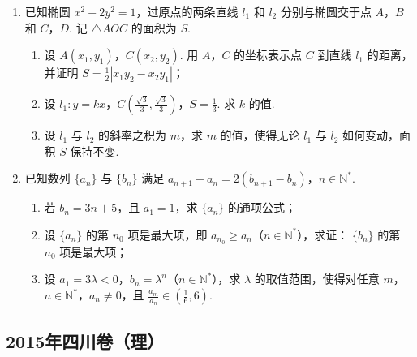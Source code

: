 \begin{description}
\begin{enumerate}[leftmargin=5pt]
        \item 已知椭圆 \(x^{2} + 2y^{2} = 1\)，过原点的两条直线 \(l_{1}\) 和 \(l_{2}\) 分别与椭圆交于点 \(A\)，\(B\) 和 \(C\)，\(D\). 记 \(\triangle AOC\) 的面积为 \(S\).
\begin{enumerate}
\item 设 \(A(x_{1}, y_{1})\)，\(C(x_{2}, y_{2})\). 用 \(A\)，\(C\) 的坐标表示点 \(C\) 到直线 \(l_{1}\) 的距离，并证明 \(S = \frac{1}{2} |x_{1}y_{2} - x_{2}y_{1}|\)；
\item 设 \(l_{1}: y = kx\)，\(C\left(\frac{\sqrt{3}}{3}, \frac{\sqrt{3}}{3}\right)\)，\(S = \frac{1}{3}\). 求 \(k\) 的值.
\item 设 \(l_{1}\) 与 \(l_{2}\) 的斜率之积为 \(m\)，求 \(m\) 的值，使得无论 \(l_{1}\) 与 \(l_{2}\) 如何变动，面积 \(S\) 保持不变.
\end{enumerate}

        \item 已知数列 \(\{a_{n}\}\) 与 \(\{b_{n}\}\) 满足 \(a_{n + 1} - a_n = 2(b_{n + 1} - b_n)\)，\(n \in \mathbb{N}^*\).
\begin{enumerate}
\item 若 \( b_{n} = 3n + 5 \)，且 \( a_{1} = 1 \)，求 \( \{a_{n}\} \) 的通项公式；
\item 设 \(\{a_{n}\}\) 的第 \(n_0\) 项是最大项，即 \(a_{n_0} \geqslant a_n\)（\(n \in \mathbb{N}^*\)），求证： \(\{b_n\}\) 的第 \(n_0\) 项是最大项；
\item 设 \(a_{1} = 3\lambda < 0\)，\(b_{n} = \lambda^{n}\)（\(n \in \mathbb{N}^{*}\)），求 \(\lambda\) 的取值范围，使得对任意 \(m\)，\(n \in \mathbb{N}^{*}\)，\(a_{n} \neq 0\)，且 \(\frac{a_{m}}{a_{n}} \in \left(\frac{1}{6}, 6\right)\).
\end{enumerate}

    \end{enumerate}

\end{description}


\subsection{2015年四川卷（理）}\label{gk:2015年四川卷（理）}

